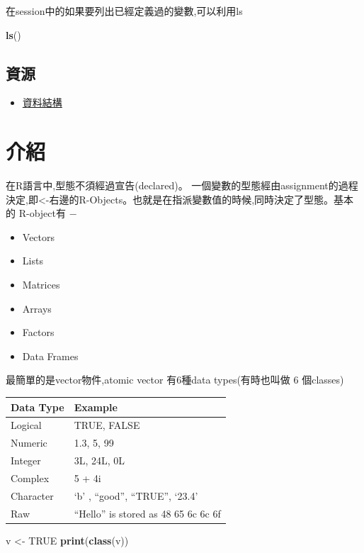 \documentclass[]{book}
\newenvironment{Shaded}{\begin{snugshade}}{\end{snugshade}}
\newcommand{\KeywordTok}[1]{\textcolor[rgb]{0.13,0.29,0.53}{\textbf{#1}}}
\newcommand{\StringTok}[1]{\textcolor[rgb]{0.31,0.60,0.02}{#1}}
\newcommand{\OtherTok}[1]{\textcolor[rgb]{0.56,0.35,0.01}{#1}}
\newcommand{\NormalTok}[1]{#1}
\providecommand{\tightlist}{%
  \setlength{\itemsep}{0pt}\setlength{\parskip}{0pt}}
\theoremstyle{definition}
\theoremstyle{definition}
\theoremstyle{definition}
\theoremstyle{remark}
\begin{document}
在session中的如果要列出已經定義過的變數,可以利用ls

\begin{Shaded}
\begin{Highlighting}[]
\KeywordTok{ls}\NormalTok{()}
\end{Highlighting}
\end{Shaded}

\subsection{資源}

\begin{itemize}
\tightlist
\item
  \href{http://adv-r.had.co.nz/Data-structures.html}{資料結構}
\end{itemize}

\section{介紹}

在R語言中,型態不須經過宣告(declared)。
一個變數的型態經由assignment的過程決定,即\textless{}-右邊的R-Objects。也就是在指派變數值的時候,同時決定了型態。基本的
R-object有 −

\begin{itemize}
\tightlist
\item
  Vectors\\
\item
  Lists\\
\item
  Matrices
\item
  Arrays
\item
  Factors
\item
  Data Frames
\end{itemize}

最簡單的是vector物件,atomic vector 有6種data types(有時也叫做 6
個classes)

\begin{longtable}[]{@{}ll@{}}
\toprule
Data Type & Example\tabularnewline
\midrule
\endhead
Logical & TRUE, FALSE\tabularnewline
Numeric & 1.3, 5, 99\tabularnewline
Integer & 3L, 24L, 0L\tabularnewline
Complex & 5 + 4i\tabularnewline
Character & `b' , ``good'', ``TRUE'', `23.4'\tabularnewline
Raw & ``Hello'' is stored as 48 65 6c 6c 6f\tabularnewline
\bottomrule
\end{longtable}

\begin{Shaded}
\begin{Highlighting}[]
\NormalTok{v <-}\StringTok{ }\OtherTok{TRUE} 
\KeywordTok{print}\NormalTok{(}\KeywordTok{class}\NormalTok{(v))}
\end{Highlighting}
\end{Shaded}
\end{document}
